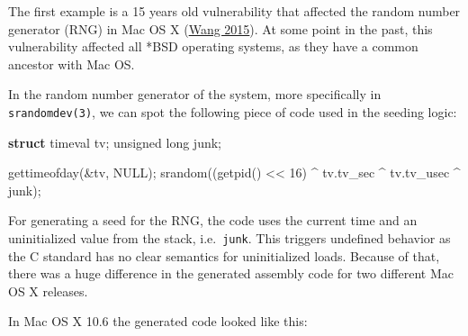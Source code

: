 \documentclass[
  a4paper,
]{report}
\newenvironment{Shaded}{}{}
\newcommand{\BaseNTok}[1]{\textcolor[rgb]{0.25,0.63,0.44}{#1}}
\newcommand{\BuiltInTok}[1]{\textcolor[rgb]{0.00,0.50,0.00}{#1}}
\newcommand{\CommentTok}[1]{\textcolor[rgb]{0.38,0.63,0.69}{\textit{#1}}}
\newcommand{\DataTypeTok}[1]{\textcolor[rgb]{0.56,0.13,0.00}{#1}}
\newcommand{\DecValTok}[1]{\textcolor[rgb]{0.25,0.63,0.44}{#1}}
\newcommand{\KeywordTok}[1]{\textcolor[rgb]{0.00,0.44,0.13}{\textbf{#1}}}
\newcommand{\NormalTok}[1]{#1}
\newcommand{\OperatorTok}[1]{\textcolor[rgb]{0.40,0.40,0.40}{#1}}
\begin{document}
The first example is a 15 years old vulnerability that affected the
random number generator (RNG) in Mac OS X
(\protect\hyperlink{ref-Wang2015}{Wang 2015}). At some point in the
past, this vulnerability affected all *BSD operating systems, as they
have a common ancestor with Mac OS.

In the random number generator of the system, more specifically in
\texttt{srandomdev(3)}, we can spot the following piece of code used in
the seeding logic:

\begin{Shaded}
\begin{Highlighting}[]
\KeywordTok{struct}\NormalTok{ timeval tv}\OperatorTok{;}
\DataTypeTok{unsigned} \DataTypeTok{long}\NormalTok{ junk}\OperatorTok{;}

\NormalTok{gettimeofday}\OperatorTok{(\&}\NormalTok{tv}\OperatorTok{,}\NormalTok{ NULL}\OperatorTok{);}
\NormalTok{srandom}\OperatorTok{((}\NormalTok{getpid}\OperatorTok{()} \OperatorTok{\textless{}\textless{}} \DecValTok{16}\OperatorTok{)} \OperatorTok{\^{}}\NormalTok{ tv}\OperatorTok{.}\NormalTok{tv\_sec }\OperatorTok{\^{}}\NormalTok{ tv}\OperatorTok{.}\NormalTok{tv\_usec }\OperatorTok{\^{}}\NormalTok{ junk}\OperatorTok{);}
\end{Highlighting}
\end{Shaded}

For generating a seed for the RNG, the code uses the current time and an
uninitialized value from the stack, i.e.~\texttt{junk}. This triggers
undefined behavior as the C standard has no clear semantics for
uninitialized loads. Because of that, there was a huge difference in the
generated assembly code for two different Mac OS X releases.

In Mac OS X 10.6 the generated code looked like this:

\begin{Shaded}
\end{Shaded}
\end{document}
